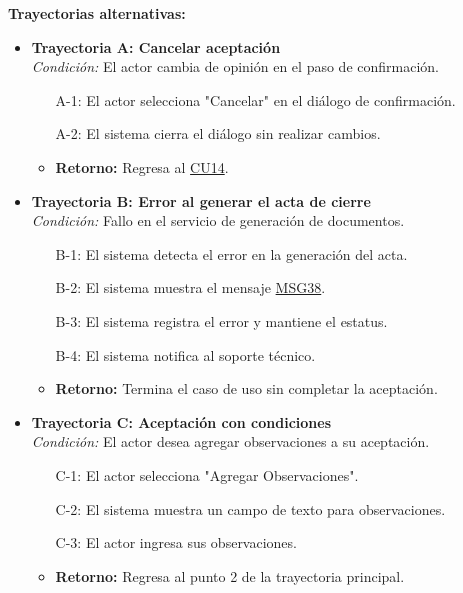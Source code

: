 \begin{appendices}
\textbf{Trayectorias alternativas:}
\begin{itemize}[leftmargin=*]
    \item \textbf{Trayectoria A: Cancelar aceptación} \\
    \textit{Condición:} El actor cambia de opinión en el paso de confirmación.
    \begin{itemize}[nosep]
        \item[A-1:] El actor selecciona "Cancelar" en el diálogo de confirmación.
        \item[A-2:] El sistema cierra el diálogo sin realizar cambios.
        \item \textbf{Retorno:} Regresa al \hyperlink{anexo:casos_uso}{CU14}.
    \end{itemize}
    \item \textbf{Trayectoria B: Error al generar el acta de cierre} \\
    \textit{Condición:} Fallo en el servicio de generación de documentos.
    \begin{itemize}[nosep]
        \item[B-1:] El sistema detecta el error en la generación del acta.
        \item[B-2:] El sistema muestra el mensaje \hyperlink{msg:MSG38}{MSG38}.
        \item[B-3:] El sistema registra el error y mantiene el estatus.
        \item[B-4:] El sistema notifica al soporte técnico.
        \item \textbf{Retorno:} Termina el caso de uso sin completar la aceptación.
    \end{itemize}
    \item \textbf{Trayectoria C: Aceptación con condiciones} \\
    \textit{Condición:} El actor desea agregar observaciones a su aceptación.
    \begin{itemize}[nosep]
        \item[C-1:] El actor selecciona "Agregar Observaciones".
        \item[C-2:] El sistema muestra un campo de texto para observaciones.
        \item[C-3:] El actor ingresa sus observaciones.
        \item \textbf{Retorno:} Regresa al punto 2 de la trayectoria principal.
    \end{itemize}
\end{itemize}


\end{appendices}
